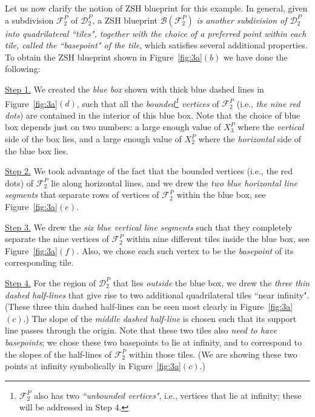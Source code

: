 \documentclass[12pt,letterpaper]{article}
\newcommand{\B}{\mathcal{B}}
\newcommand{\F}{\mathcal{F}}
\begin{document}
\bigskip

Let us now clarify the notion of ZSH blueprint for this example. 
%
In general, given a subdivision $\mathcal{F}_2^P$ of $\mathscr{D}_2^P$, a ZSH blueprint $\B(\F_2^P)$ {\em is another  subdivision of $\mathscr{D}_2^P$ into quadrilateral ``tiles", together with the choice of a preferred point within each tile, called the ``basepoint" of the tile}, which satisfies several additional properties. 
%
To obtain the ZSH blueprint shown in Figure~\ref{fig:3a}$(b)$ we have done the following:

\smallskip

\underline{Step 1.} We created the {\em blue box} shown with thick blue dashed lines in Figure~\ref{fig:3a}$(d)$, such that all the {\em bounded\footnote{$\F_2^P$ also has two {\em ``unbounded vertices"}, i.e., vertices that lie at infinity; these will be addressed in Step 4.} vertices}  of $\mathcal{F}_2^P$ (i.e., {\em the nine red dots}) are contained in the interior of this blue box. Note that the choice of blue box depends just on two numbers: a large enough value of $X_3^P$ where the {\em vertical} side of the box lies, and a large enough value of $X_2^P$ where the {\em horizontal} side of the blue box lies. 

\smallskip

\underline{Step 2.} We took advantage of the fact that the bounded vertices (i.e., the red dots) of $\mathcal{F}_2^P$ lie along horizontal lines, and we drew the {\em two blue horizontal line segments} that separate rows of vertices of $\mathcal{F}_2^P$ within the blue box, see Figure~\ref{fig:3a}$(e)$.

\smallskip

\underline{Step 3.} We drew the {\em six blue vertical line segments} such that they completely separate the nine vertices of $\mathcal{F}_2^P$ within nine different tiles inside the blue box, see Figure~\ref{fig:3a}$(f)$. Also, we chose each such vertex to be the {\em basepoint} of its corresponding tile.

\smallskip

\underline{Step 4.} For the region of $\mathscr{D}_2^P$ that lies {\em outside} the blue box, we drew the {\em three thin dashed half-lines} that give rise to two additional quadrilateral tiles ``near infinity". (These three thin dashed half-lines can  be seen most clearly in Figure~\ref{fig:3a}$(c)$.) The slope of the {\em middle dashed half-line} is chosen such that its support line passes through the origin. Note that these two tiles also {\em need to have basepoints}; we chose these two basepoints to lie at infinity, and to correspond to the slopes of the half-lines of $\mathcal{F}_2^P$ within those tiles. (We are showing these two points at infinity symbolically in Figure~\ref{fig:3a}$(c)$.)
\end{document}
